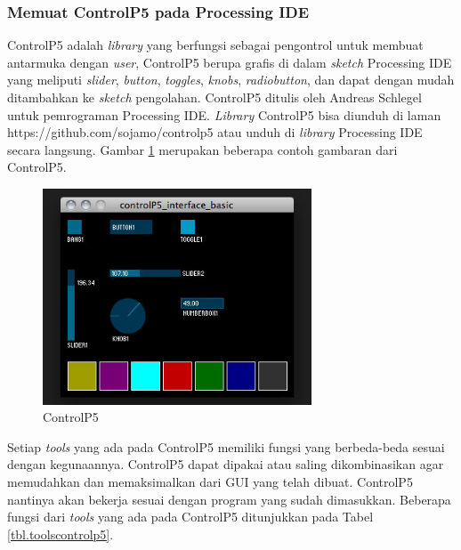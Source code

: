 \subsubsection{ Memuat ControlP5 pada Processing IDE }
ControlP5 adalah \textit{library} yang berfungsi sebagai pengontrol untuk membuat antarmuka dengan \textit{user}, ControlP5 berupa grafis di dalam \textit{sketch} Processing IDE yang meliputi \textit{slider}, \textit{button}, \textit{toggles}, \textit{knobs}, \textit{radiobutton}, dan dapat dengan mudah ditambahkan ke \textit{sketch} pengolahan. ControlP5 ditulis oleh Andreas Schlegel untuk pemrograman Processing IDE. \textit{Library} ControlP5 bisa diunduh di laman https://github.com/sojamo/controlp5 atau unduh di \textit{library} Processing IDE secara langsung. Gambar \ref{pic.controlp5} merupakan beberapa contoh gambaran dari ControlP5.
\begin{figure}[H]
	\centering
	\includegraphics[width=8cm]{gambar/controlp5.jpg}
	\caption{ControlP5}
	\label{pic.controlp5}
\end{figure}
Setiap \textit{tools} yang ada pada ControlP5 memiliki fungsi yang berbeda-beda sesuai dengan kegunaannya. ControlP5 dapat dipakai atau saling dikombinasikan agar memudahkan dan memaksimalkan dari GUI yang telah dibuat. ControlP5 nantinya akan bekerja sesuai dengan program yang sudah dimasukkan. Beberapa fungsi dari \textit{tools} yang ada pada ControlP5 ditunjukkan pada Tabel \ref{tbl.toolscontrolp5}.
